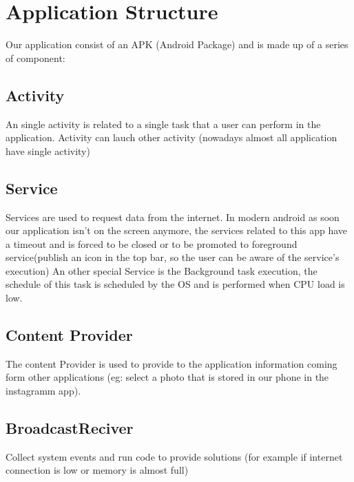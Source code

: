 \documentclass[12pt]{article}
\begin{document}
\section{Application Structure}
Our application consist of an APK (Android Package) and is made up of a series of component: 
\subsection{Activity}
An single activity is related to a single task that a user can perform in the application. Activity can lauch other activity (nowadays almost all application have single activity)
\subsection{Service}
Services are used to request data from the internet. In modern android as soon our application isn't on the screen anymore, the services related to this app have a timeout and is forced to be closed or to be promoted to foreground service(publish an icon in the top bar, so the user can be aware of the service's execution)
An other special Service is the Background task execution, the schedule of this task is scheduled by the OS and is performed when CPU load is low.
\subsection{Content Provider}
The content Provider is used to provide to the application information coming form other applications (eg: select a photo that is stored in our phone in the instagramm app). 
\subsection{BroadcastReciver}
Collect system events and run code to provide solutions (for example if internet connection is low or memory is almost full)


\subsection{}

\section{}

\section{}

\section{}

\section{}
\end{document}
